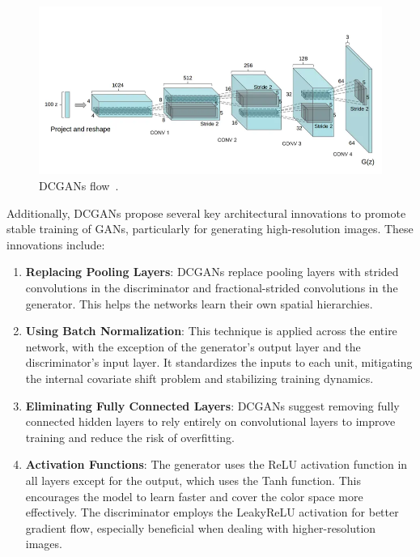 \begin{figure}[!htb]
    \centering
    \includegraphics[scale=0.4]{Images/DCGAN-example.jpg}
    \caption{DCGANs flow~\cite{DCGANsFlow}.}
    \label{fig:DCGANsFlow}
\end{figure}

Additionally, DCGANs propose several key architectural innovations to promote stable training of GANs, particularly for generating high-resolution images. These innovations include:
\begin{enumerate}
    \item \textbf{Replacing Pooling Layers}: DCGANs replace pooling layers with strided convolutions in the discriminator and fractional-strided convolutions in the generator. This helps the networks learn their own spatial hierarchies.
    \item \textbf{Using Batch Normalization}: This technique is applied across the entire network, with the exception of the generator's output layer and the discriminator's input layer. It standardizes the inputs to each unit, mitigating the internal covariate shift problem and stabilizing training dynamics.
    \item \textbf{Eliminating Fully Connected Layers}: DCGANs suggest removing fully connected hidden layers to rely entirely on convolutional layers to improve training and reduce the risk of overfitting.
    \item \textbf{Activation Functions}: The generator uses the ReLU activation function in all layers except for the output, which uses the Tanh function. This encourages the model to learn faster and cover the color space more effectively. The discriminator employs the LeakyReLU activation for better gradient flow, especially beneficial when dealing with higher-resolution images.
\end{enumerate}


